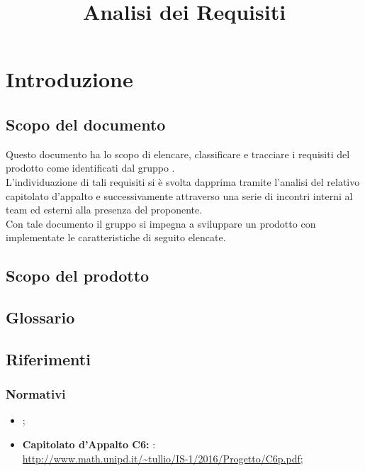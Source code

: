 

\usepackage{hyperref}
\usepackage{longtable}
\hypersetup{hidelinks}

\author{\ALL}
\supervisor{\ALL}
\title{Analisi dei Requisiti}

\renewcommand{\arraystretch}{1.5}
\setcounter{tocdepth}{4}
\setcounter{secnumdepth}{4}


\maketitle

\tableofcontents
\newpage
\section{Introduzione}
	\subsection{Scopo del documento}
	Questo documento ha lo scopo di elencare, classificare e tracciare i requisiti del prodotto \proj{} come identificati dal gruppo \hx{}. 
	\\L'individuazione di tali requisiti si è svolta dapprima tramite l'analisi del relativo capitolato d'appalto e successivamente attraverso una serie di incontri interni al team ed esterni alla presenza del proponente.
	\\Con tale documento il gruppo \hx{} si impegna a sviluppare un prodotto con implementate le caratteristiche di seguito elencate.

	\subsection{Scopo del prodotto}
	\scopo{}
	
	\subsection{Glossario}
	\presgloss{}
	
	\subsection{Riferimenti}
		\subsubsection{Normativi}
		\begin{itemize}
			\item \emph{\NdP};
			\item \textbf{Capitolato d'Appalto C6: \proj}:
			\\ \url{http://www.math.unipd.it/~tullio/IS-1/2016/Progetto/C6p.pdf};
		\end{itemize}
		
